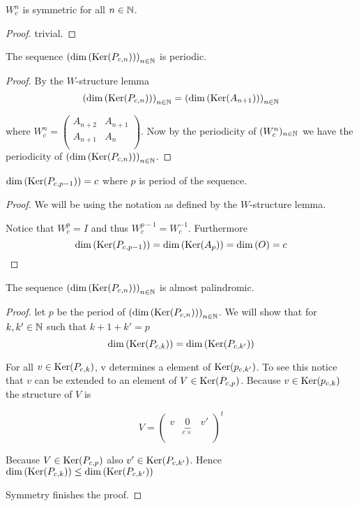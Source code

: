 \begin{corollary}
  $W_{c}^{n}$ is symmetric for all $n\in\mathbb{N}$.
\end{corollary}

\begin{proof}
  trivial.
\end{proof}

\begin{proposition}
  The sequence $\left(\dim\left(\operatorname{Ker}(P_{c,n})\right)\right)_{n\in\mathbb{N}}$
  is periodic.
\end{proposition}

\begin{proof}
  By the $W$-structure lemma
  \[
  \left(\dim\left(\operatorname{Ker}(P_{c,n})\right)\right)_{n\in\mathbb{N}} 
  = 
  \left(\dim\left(\operatorname{Ker}(A_{n+1})\right)\right)_{n\in\mathbb{N}}
  \]

  where $W_{c}^{n}=\left(\begin{smallmatrix} A_{n+2} & A_{n+1}  \\ A_{n+1} & A_{n} \\\end{smallmatrix}\right)$.
  Now  by the periodicity of $(W_{c}^{n})_{n\in\mathbb{N}}$ we have the
  periodicity of
  $\left(\dim\left(\operatorname{Ker}(P_{c,n})\right)\right)_{n\in\mathbb{N}}$.
\end{proof}

\begin{lemma}
  $\dim\left(\operatorname{Ker}(P_{c,p-1})\right) = c$ where $p$ is period of the sequence. 
\end{lemma}

\begin{proof}
  We will be using the notation as defined by the $W$-structure lemma.

  Notice that $W_{c}^{p} = I$ and thus $W_{c}^{p-1} = W_{c}^{-1}$.
  Furthermore
  \[
  \dim\left(\operatorname{Ker}(P_{c,p-1})\right)
  =
  \dim\left(\operatorname{Ker}(A_{p})\right) = \dim\left(O\right)
  = c
  \]
\end{proof}

\begin{theorem}
  The sequence $\left(\dim\left(\operatorname{Ker}(P_{c,n})\right)\right)_{n\in\mathbb{N}}$
  is almost palindromic.
\end{theorem}

\begin{proof}
  let $p$ be the period of
  $\left(\dim\left(\operatorname{Ker}(P_{c,n})\right)\right)_{n\in\mathbb{N}}$. We will show
  that for $k,k'\in\mathbb{N}$ such that $k+1+k'=p$
  \[
  \dim\left(\operatorname{Ker}(P_{c,k})\right) = \dim\left(\operatorname{Ker}(P_{c,k'})\right)
  \]

  For all $v\in\operatorname{Ker}(P_{c,k})$, v determines a element of
  $\operatorname{Ker}(p_{c,k'})$. To see this notice that $v$ can be extended to an
  element of $V\in\operatorname{Ker}(P_{c,p})$. Because $v\in\operatorname{Ker}(p_{c,k})$ the
  structure of $V$ is
  
  \[
  V =
  \left(
  \begin{array}{ccc}
    v & \underbrace{0}_{c\times} & v' \\
  \end{array}
  \right)^{t}
  \]
  
  Because $V\in\operatorname{Ker}(P_{c,p})$ also
  $v'\in\operatorname{Ker}(P_{c,k'})$. Hence  $\dim\left(\operatorname{Ker}(P_{c,k})\right) \le
  \dim\left(\operatorname{Ker}(P_{c,k'})\right)$ 

  Symmetry finishes the proof.
\end{proof}
